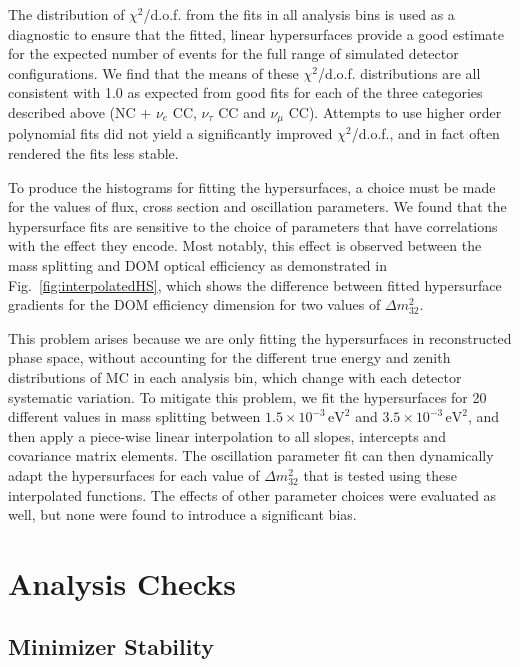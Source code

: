 The distribution of $\chi^{2}$/d.o.f. from the fits in all analysis bins is used as a diagnostic to ensure that the fitted, linear hypersurfaces provide a good estimate for the expected number of events for the full range of simulated detector configurations. We find that the means of these $\chi^{2}$/d.o.f. distributions are all consistent with 1.0 as expected from good fits for each of the three categories described above (NC + $\nu_{e}$ CC, $\nu_{\tau}$ CC and $\nu_{\mu}$ CC). Attempts to use higher order polynomial fits did not yield a significantly improved $\chi^{2}$/d.o.f., and in fact often rendered the fits less stable. 

To produce the histograms for fitting the hypersurfaces, a choice must be made for the values of flux, cross section and oscillation parameters. We found that the hypersurface fits are sensitive to the choice of parameters that have correlations with the effect they encode. Most notably, this effect is observed between the mass splitting and DOM optical efficiency as demonstrated in Fig.~\ref{fig:interpolatedHS}, which shows the difference between fitted hypersurface gradients for the DOM efficiency dimension for two values of $\Delta m^{2}_{32}$. 

This problem arises because we are only fitting the hypersurfaces in reconstructed phase space, without accounting for the different true energy and zenith distributions of MC in each analysis bin, which change with each detector systematic variation. To mitigate this problem, we fit the hypersurfaces for 20 different values in mass splitting between $1.5\times 10^{-3}\,\mathrm{eV}^2$ and $3.5\times 10^{-3}\,\mathrm{eV}^2$, and then apply a piece-wise linear interpolation to all slopes, intercepts and covariance matrix elements. The oscillation parameter fit can then dynamically adapt the hypersurfaces for each value of $\Delta m^{2}_{32}$ that is tested using these interpolated functions. The effects of other parameter choices were evaluated as well, but none were found to introduce a significant bias.


\section{Analysis Checks}

\subsection{Minimizer Stability}

